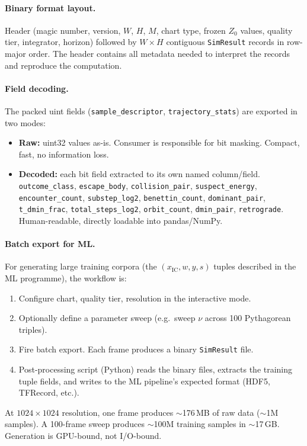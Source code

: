 \documentclass[11pt]{report}
\begin{document}
\paragraph{Binary format layout.} Header (magic number, version, $W$, $H$, $M$, chart type, frozen $Z_0$ values, quality tier, integrator, horizon) followed by $W\times H$ contiguous \texttt{SimResult} records in row-major order. The header contains all metadata needed to interpret the records and reproduce the computation.

\paragraph{Field decoding.} The packed uint fields (\texttt{sample\_descriptor}, \texttt{trajectory\_stats}) are exported in two modes:
\begin{itemize}[nosep]
\item \textbf{Raw:} uint32 values as-is. Consumer is responsible for bit masking. Compact, fast, no information loss.
\item \textbf{Decoded:} each bit field extracted to its own named column/field. \texttt{outcome\_class}, \texttt{escape\_body}, \texttt{collision\_pair}, \texttt{suspect\_energy}, \texttt{encounter\_count}, \texttt{substep\_log2}, \texttt{benettin\_count}, \texttt{dominant\_pair}, \texttt{t\_dmin\_frac}, \texttt{total\_steps\_log2}, \texttt{orbit\_count}, \texttt{dmin\_pair}, \texttt{retrograde}. Human-readable, directly loadable into pandas/NumPy.
\end{itemize}

\paragraph{Batch export for ML.} For generating large training corpora (the $(x_{\mathrm{IC}}, w, y, s)$ tuples described in the ML programme), the workflow is:
\begin{enumerate}[nosep]
\item Configure chart, quality tier, resolution in the interactive mode.
\item Optionally define a parameter sweep (e.g.\ sweep $\nu$ across 100 Pythagorean triples).
\item Fire batch export. Each frame produces a binary \texttt{SimResult} file.
\item Post-processing script (Python) reads the binary files, extracts the training tuple fields, and writes to the ML pipeline's expected format (HDF5, TFRecord, etc.).
\end{enumerate}
At $1024\times 1024$ resolution, one frame produces $\sim$176\,MB of raw data ($\sim$1M samples). A 100-frame sweep produces $\sim$100M training samples in $\sim$17\,GB. Generation is GPU-bound, not I/O-bound.
\end{document}
